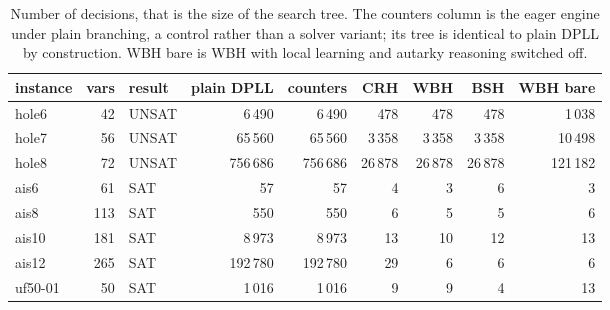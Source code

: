 \begin{table}[H]
\centering
\small
\setlength{\tabcolsep}{5pt}
\begin{tabular}{lrlrrrrrr}
\toprule
instance & vars & result & plain DPLL & counters & CRH & WBH & BSH & WBH bare \\
\midrule
hole6 & 42 & UNSAT & 6\,490 & 6\,490 & 478 & 478 & 478 & 1\,038 \\
hole7 & 56 & UNSAT & 65\,560 & 65\,560 & 3\,358 & 3\,358 & 3\,358 & 10\,498 \\
hole8 & 72 & UNSAT & 756\,686 & 756\,686 & 26\,878 & 26\,878 & 26\,878 & 121\,182 \\
ais6 & 61 & SAT & 57 & 57 & 4 & 3 & 6 & 3 \\
ais8 & 113 & SAT & 550 & 550 & 6 & 5 & 5 & 6 \\
ais10 & 181 & SAT & 8\,973 & 8\,973 & 13 & 10 & 12 & 13 \\
ais12 & 265 & SAT & 192\,780 & 192\,780 & 29 & 6 & 6 & 6 \\
uf50-01 & 50 & SAT & 1\,016 & 1\,016 & 9 & 9 & 4 & 13 \\
\bottomrule
\end{tabular}
\caption{Number of decisions, that is the size of the search tree. The counters column is the eager engine under plain branching, a control rather than a solver variant; its tree is identical to plain DPLL by construction. WBH bare is WBH with local learning and autarky reasoning switched off.}
\label{tab:decisions}
\end{table}
